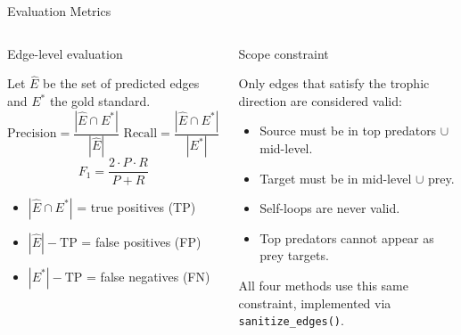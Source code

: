 \documentclass[aspectratio=169,11pt]{beamer}
\newcommand{\panelbox}[2]{%
  \begin{block}{#1}
    \raggedright
    #2
  \end{block}
}
\newenvironment{twopanelrow}{\begin{columns}[T,onlytextwidth]}{\end{columns}}
\newcommand{\twopanel}[2]{\column{0.480\textwidth}\panelbox{#1}{#2}}
\begin{document}

\begin{frame}{Evaluation Metrics}
  \begin{twopanelrow}
    \twopanel{Edge-level evaluation}{
      Let $\hat{E}$ be the set of predicted edges and $E^{*}$ the gold standard.
      \[
        \text{Precision} = \frac{|\hat{E} \cap E^{*}|}{|\hat{E}|}
        \text{ Recall} = \frac{|\hat{E} \cap E^{*}|}{|E^{*}|}
      \]
      \[
        F_1 = \frac{2 \cdot P \cdot R}{P + R}
      \]
      \begin{itemize}
        \item $|\hat{E} \cap E^{*}|$ = true positives (TP)
        \item $|\hat{E}| - \text{TP}$ = false positives (FP)
        \item $|E^{*}| - \text{TP}$ = false negatives (FN)
      \end{itemize}
    }
    \twopanel{Scope constraint}{
      \small
      Only edges that satisfy the trophic direction are considered valid:
      \vspace{0.3em}
      \begin{itemize}
        \item Source must be in \textcolor{td3red}{top predators} $\cup$ \textcolor{td3gold}{mid-level}.
        \item Target must be in \textcolor{td3gold}{mid-level} $\cup$ \textcolor{td3green}{prey}.
        \item Self-loops are never valid.
        \item Top predators cannot appear as prey targets.
      \end{itemize}
      \vspace{0.3em}
      All four methods use this same constraint, implemented via \texttt{sanitize\_edges()}.
    }
  \end{twopanelrow}
\end{frame}

\end{document}
